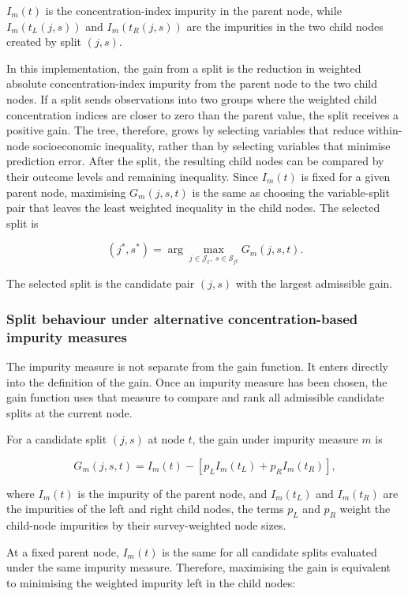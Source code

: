 \documentclass[
  11pt,
  a4paper,
]{article}
\begin{document}
\(I_m(t)\) is the concentration-index impurity in the parent node, while
\(I_m(t_L(j,s))\) and \(I_m(t_R(j,s))\) are the impurities in the two
child nodes created by split \((j,s)\).

In this implementation, the gain from a split is the reduction in
weighted absolute concentration-index impurity from the parent node to
the two child nodes. If a split sends observations into two groups where
the weighted child concentration indices are closer to zero than the
parent value, the split receives a positive gain. The tree, therefore,
grows by selecting variables that reduce within-node socioeconomic
inequality, rather than by selecting variables that minimise prediction
error. After the split, the resulting child nodes can be compared by
their outcome levels and remaining inequality. Since \(I_m(t)\) is fixed
for a given parent node, maximising \(G_m(j,s,t)\) is the same as
choosing the variable-split pair that leaves the least weighted
inequality in the child nodes. The selected split is

\[
(j^*, s^*)
=
\arg\max_{j \in \mathcal{J}_t,\; s \in \mathcal{S}_{jt}}
G_m(j, s, t).
\]

The selected split is the candidate pair \((j,s)\) with the largest
admissible gain.

\subsubsection{Split behaviour under alternative concentration-based
impurity measures}\label{sec-split-behaviour-impurity}

The impurity measure is not separate from the gain function. It enters
directly into the definition of the gain. Once an impurity measure has
been chosen, the gain function uses that measure to compare and rank all
admissible candidate splits at the current node.

For a candidate split \((j,s)\) at node \(t\), the gain under impurity
measure \(m\) is

\[
G_m(j,s,t)
=
I_m(t)
-
\left[
p_L I_m(t_L) + p_R I_m(t_R)
\right],
\]

where \(I_m(t)\) is the impurity of the parent node, and \(I_m(t_L)\)
and \(I_m(t_R)\) are the impurities of the left and right child nodes,
the terms \(p_L\) and \(p_R\) weight the child-node impurities by their
survey-weighted node sizes.

At a fixed parent node, \(I_m(t)\) is the same for all candidate splits
evaluated under the same impurity measure. Therefore, maximising the
gain is equivalent to minimising the weighted impurity left in the child
nodes:
\end{document}

